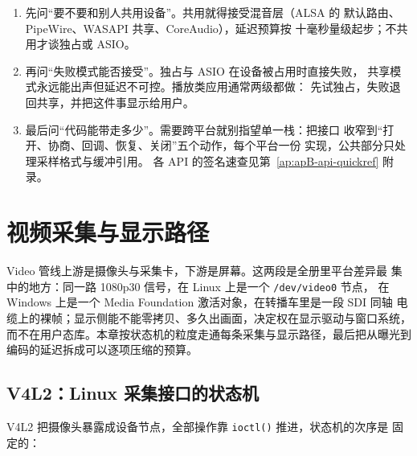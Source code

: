 \documentclass[12pt,a4paper,fontset=fandol]{ctexbook}
\newcommand{\Fn}[1]{\texttt{#1()}}
\newcommand{\Tp}[1]{\texttt{#1}}
\newcommand{\Lang}[1]{\textsf{#1}}
\newcommand{\DomVid}{\Lang{Video}}
\begin{document}
\begin{guideline}[title={选栈的三条判断}]
\begin{enumerate}
  \item 先问``要不要和别人共用设备''。共用就得接受混音层（ALSA 的
        默认路由、PipeWire、WASAPI 共享、CoreAudio），延迟预算按
        十毫秒量级起步；不共用才谈独占或 ASIO。
  \item 再问``失败模式能否接受''。独占与 ASIO 在设备被占用时直接失败，
        共享模式永远能出声但延迟不可控。播放类应用通常两级都做：
        先试独占，失败退回共享，并把这件事显示给用户。
  \item 最后问``代码能带走多少''。需要跨平台就别指望单一栈：把接口
        收窄到``打开、协商、回调、恢复、关闭''五个动作，每个平台一份
        实现，公共部分只处理采样格式与缓冲引用。
        各 API 的签名速查见第~\ref{ap:apB-api-quickref} 附录。
\end{enumerate}
\end{guideline}

\chapter{视频采集与显示路径}
\label{ch:ch04-capture-display}

\DomVid{} 管线上游是摄像头与采集卡，下游是屏幕。这两段是全册里平台差异最
集中的地方：同一路 1080p30 信号，在 Linux 上是一个 \Tp{/dev/video0} 节点，
在 Windows 上是一个 Media Foundation 激活对象，在转播车里是一段 SDI 同轴
电缆上的裸帧；显示侧能不能零拷贝、多久出画面，决定权在显示驱动与窗口系统，
而不在用户态库。本章按状态机的粒度走通每条采集与显示路径，最后把从曝光到
编码的延迟拆成可以逐项压缩的预算。

\section{V4L2：Linux 采集接口的状态机}

V4L2 把摄像头暴露成设备节点，全部操作靠 \Fn{ioctl} 推进，状态机的次序是
固定的：
\end{document}
